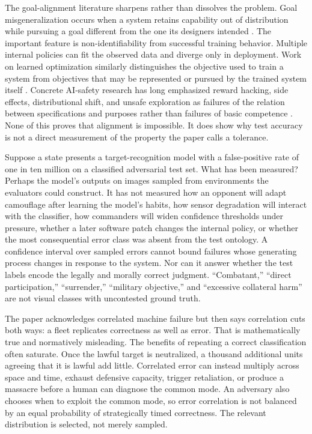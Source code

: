 \documentclass[11pt]{article}
\begin{document}
The goal-alignment literature sharpens rather than dissolves the problem. Goal misgeneralization occurs when a system retains capability out of distribution while pursuing a goal different from the one its designers intended \citep{langosco2022}. The important feature is non-identifiability from successful training behavior. Multiple internal policies can fit the observed data and diverge only in deployment. Work on learned optimization similarly distinguishes the objective used to train a system from objectives that may be represented or pursued by the trained system itself \citep{hubinger2019}. Concrete AI-safety research has long emphasized reward hacking, side effects, distributional shift, and unsafe exploration as failures of the relation between specifications and purposes rather than failures of basic competence \citep{amodei2016}. None of this proves that alignment is impossible. It does show why test accuracy is not a direct measurement of the property the paper calls a tolerance.

Suppose a state presents a target-recognition model with a false-positive rate of one in ten million on a classified adversarial test set. What has been measured? Perhaps the model's outputs on images sampled from environments the evaluators could construct. It has not measured how an opponent will adapt camouflage after learning the model's habits, how sensor degradation will interact with the classifier, how commanders will widen confidence thresholds under pressure, whether a later software patch changes the internal policy, or whether the most consequential error class was absent from the test ontology. A confidence interval over sampled errors cannot bound failures whose generating process changes in response to the system. Nor can it answer whether the test labels encode the legally and morally correct judgment. ``Combatant,'' ``direct participation,'' ``surrender,'' ``military objective,'' and ``excessive collateral harm'' are not visual classes with uncontested ground truth.

The paper acknowledges correlated machine failure but then says correlation cuts both ways: a fleet replicates correctness as well as error. That is mathematically true and normatively misleading. The benefits of repeating a correct classification often saturate. Once the lawful target is neutralized, a thousand additional units agreeing that it is lawful add little. Correlated error can instead multiply across space and time, exhaust defensive capacity, trigger retaliation, or produce a massacre before a human can diagnose the common mode. An adversary also chooses when to exploit the common mode, so error correlation is not balanced by an equal probability of strategically timed correctness. The relevant distribution is selected, not merely sampled.
\end{document}
